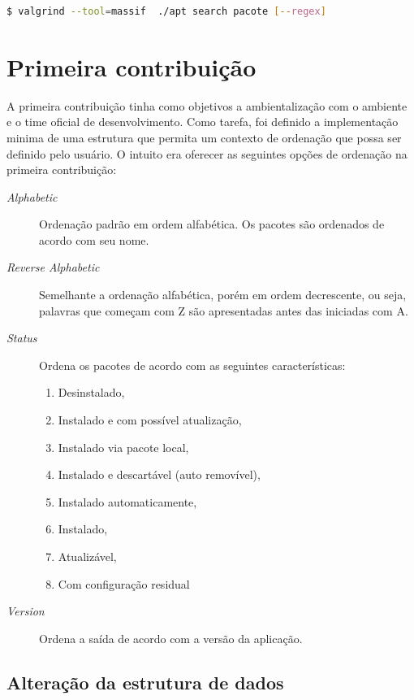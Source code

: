 \begin{lstlisting}[language=Bash,label=valgrind_call, numbers=none]
   $ valgrind --tool=massif  ./apt search pacote [--regex]
\end{lstlisting}


\section{Primeira contribuição} %
\label{sec:primeira_contribui_o}

A primeira contribuição tinha como objetivos a ambientalização com o ambiente e o time oficial de desenvolvimento. Como tarefa, foi definido a implementação minima de uma estrutura que permita um contexto de ordenação que possa ser definido pelo usuário. O intuito era oferecer as seguintes opções de ordenação na primeira contribuição:

\begin{description}
	\item [\textit{Alphabetic}] Ordenação padrão em ordem alfabética. Os pacotes são ordenados de acordo com seu nome.
	\item [\textit{Reverse Alphabetic}] Semelhante a ordenação alfabética, porém em ordem decrescente, ou seja, palavras que começam com {\code Z} são apresentadas antes das iniciadas com {\code A}.
	\item [\textit{Status}] Ordena os pacotes de acordo com as seguintes características:
	\begin{enumerate}
		\item Desinstalado,
		\item Instalado e com possível atualização,
		\item Instalado via pacote local,
		\item Instalado e descartável (auto removível),
		\item Instalado automaticamente,
		\item Instalado,
		\item Atualizável,
		\item Com configuração residual
	\end{enumerate}
	\item [\textit{Version}] Ordena a saída de acordo com a versão da aplicação.
\end{description}

\subsection*{Alteração da estrutura de dados} %
\label{sub:altera_o_da_estrutuda_de_dados}

